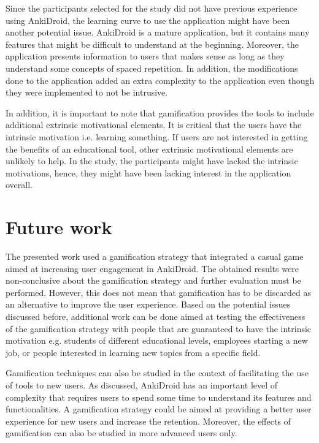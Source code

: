 Since the participants selected for the study did not have previous experience using AnkiDroid, the learning curve to use the application might have been another potential issue. AnkiDroid is a mature application, but it contains many features that might be difficult to understand at the beginning. Moreover, the application presents information to users that makes sense as long as they understand some concepts of spaced repetition. In addition, the modifications done to the application added an extra complexity to the application even though they were implemented to not be intrusive.

In addition, it is important to note that gamification provides the tools to include additional extrinsic motivational elements. It is critical that the users have the intrinsic motivation i.e. learning something. If users are not interested in getting the benefits of an educational tool, other extrinsic motivational elements are unlikely to help. In the study, the participants might have lacked the intrinsic motivations, hence, they might have been lacking interest in the application overall.

\section{Future work}
The presented work used a gamification strategy that integrated a casual game aimed at increasing user engagement in AnkiDroid. The obtained results were non-conclusive about the gamification strategy and further evaluation must be performed. However, this does not mean that gamification has to be discarded as an alternative to improve the user experience. Based on the potential issues discussed before, additional work can be done aimed at testing the effectiveness of the gamification strategy with people that are guaranteed to have the intrinsic motivation e.g. students of different educational levels, employees starting a new job, or people interested in learning new topics from a specific field.

Gamification techniques can also be studied in the context of facilitating the use of tools to new users. As discussed, AnkiDroid has an important level of complexity that requires users to spend some time to understand its features and functionalities. A gamification strategy could be aimed at providing a better user experience for new users and increase the retention. Moreover, the effects of gamification can also be studied in more advanced users only.